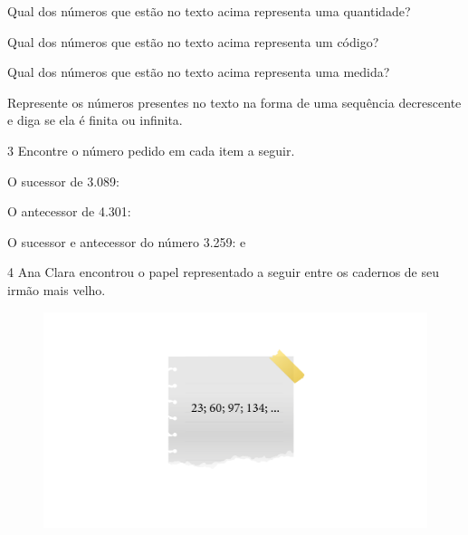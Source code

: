 \begin{escolha}
\item
  Qual dos números que estão no texto acima representa uma
  quantidade? \preencher {}
\item
  Qual dos números que estão no texto acima representa um
  código? \preencher {}
\item
  Qual dos números que estão no texto acima representa uma
  medida? \preencher {}
\item
  Represente os números presentes no texto na forma de uma sequência
  decrescente e diga se ela é finita ou infinita.

\end{escolha}


\num{3} Encontre o número pedido em cada item a seguir.

\begin{escolha}
\item
  O sucessor de 3.089: \preencher{}
\item
  O antecessor de 4.301: \preencher{}
\item
  O sucessor e antecessor do número 3.259: \preencher{} e \preencher{}
\end{escolha}


\num{4} Ana Clara encontrou o papel representado a seguir entre os cadernos de seu irmão mais velho.

\begin{figure}[htpb!]
\includegraphics[width=\textwidth]{../ilustracoes/MAT5/SAEB_5ANO_MAT_figura27.png}
\end{figure}

